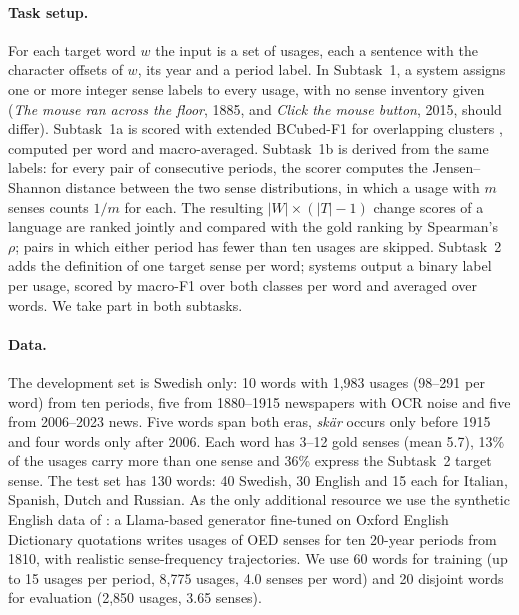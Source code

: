 \documentclass[11pt]{article}
\begin{document}
\paragraph{Task setup.}
For each target word $w$ the input is a set of usages, each a sentence with the character offsets of $w$, its year and a period label. In Subtask~1, a system assigns one or more integer sense labels to every usage, with no sense inventory given (\emph{The mouse ran across the floor}, 1885, and \emph{Click the mouse button}, 2015, should differ). Subtask~1a is scored with extended BCubed-F1 for overlapping clusters \citep{bagga1998entity,amigo2009comparison}, computed per word and macro-averaged. Subtask~1b is derived from the same labels: for every pair of consecutive periods, the scorer computes the Jensen--Shannon distance \citep[base 2;][]{lin1991divergence} between the two sense distributions, in which a usage with $m$ senses counts $1/m$ for each. The resulting $|W|\times(|T|-1)$ change scores of a language are ranked jointly and compared with the gold ranking by Spearman's~$\rho$; pairs in which either period has fewer than ten usages are skipped. Subtask~2 adds the definition of one target sense per word; systems output a binary label per usage, scored by macro-F1 over both classes per word and averaged over words. We take part in both subtasks.

\paragraph{Data.}
The development set is Swedish only: 10 words with 1,983 usages (98--291 per word) from ten periods, five from 1880--1915 newspapers with OCR noise and five from 2006--2023 news. Five words span both eras, \emph{skär} occurs only before 1915 and four words only after 2006. Each word has 3--12 gold senses (mean 5.7), 13\% of the usages carry more than one sense and 36\% express the Subtask~2 target sense. The test set has 130 words: 40 Swedish, 30 English and 15 each for Italian, Spanish, Dutch and Russian. As the only additional resource we use the synthetic English data of \citet{saponara2026generating}: a Llama-based generator fine-tuned on Oxford English Dictionary quotations writes usages of OED senses for ten 20-year periods from 1810, with realistic sense-frequency trajectories. We use 60 words for training (up to 15 usages per period, 8,775 usages, 4.0 senses per word) and 20 disjoint words for evaluation (2,850 usages, 3.65 senses).
\end{document}
